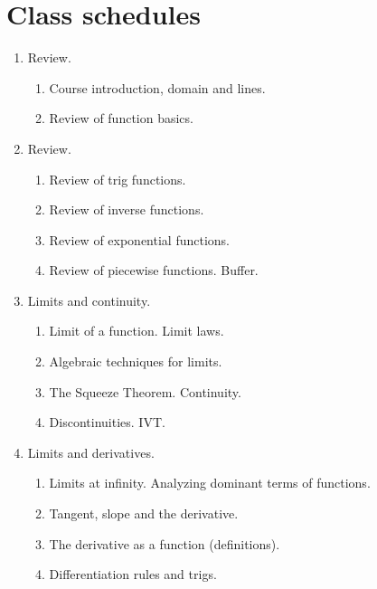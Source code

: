 \documentclass[../main.tex]{subfiles}
\begin{document}
\section{Class schedules}

\begin{multicols}{2}
  \begin{enumerate}[wide, label={\textbf{Week \arabic*}.}]
    \item Review.
      \begin{enumerate}[label={\arabic*}.]
        \item Course introduction, domain and lines.
        \item Review of function basics.
      \end{enumerate}

    \item Review.
      \begin{enumerate}[resume]
        \item Review of trig functions.
        \item Review of inverse functions.
        \item Review of exponential functions.
        \item Review of piecewise functions. Buffer.
      \end{enumerate}

    \item Limits and continuity.
      \begin{enumerate}[resume]
        \item Limit of a function. Limit laws.
        \item Algebraic techniques for limits. 
        \item The Squeeze Theorem. Continuity.
        \item Discontinuities. IVT. 
      \end{enumerate}

    \item Limits and derivatives.
      \begin{enumerate}[resume]
        \item Limits at infinity. Analyzing dominant terms of functions. 
        \item Tangent, slope and the derivative.
        \item The derivative as a function (definitions).
        \item Differentiation rules and trigs.
      \end{enumerate}


\end{enumerate}
\end{multicols}
\end{document}
